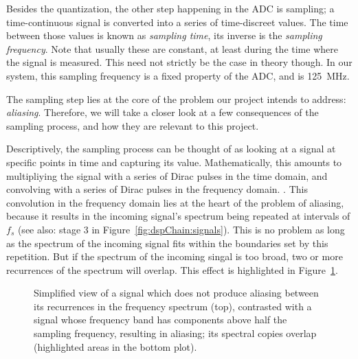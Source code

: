 Besides the quantization,  the other step happening in the  ADC is sampling; a
time-continuous signal is converted into a series of time-discreet values. The
time between those values is known as \emph{sampling time}, its inverse is the
\emph{sampling  frequency}. Note that  usually  these are  constant, at  least
during the  time where the signal  is measured. This need not  strictly be the
case  in theory  though. In our  system, this  sampling frequency  is a  fixed
property of the ADC, and is \SI{125}{\mega\hertz}.

The sampling  step lies  at the  core of  the problem  our project  intends to
address:  \emph{aliasing}. Therefore, we  will take  a  closer look  at a  few
consequences  of the  sampling  process, and  how they  are  relevant to  this
project.

Descriptively, the sampling  process can be thought of as  looking at a signal
at  specific points  in  time and  capturing  its value. Mathematically,  this
amounts to multipliying the  signal with a series of Dirac  pulses in the time
domain,  and  convolving with  a  series  of  Dirac  pulses in  the  frequency
domain\footnotemark.
.
This  convolution  in   the  frequency  domain  lies  at  the   heart  of  the
problem   of  aliasing,   because  it   results  in   the  incoming   signal's
spectrum  being  repeated  at  intervals  of  $f_s$  (see  also:  stage  3  in
Figure~\ref{fig:dspChain:signals}). This is no problem as long as the spectrum
of the incoming signal fits within  the boundaries set by this repetition. But
if  the  spectrum   of  the  incoming  singal  is  too   broad,  two  or  more
recurrences  of  the spectrum  will  overlap. This  effect is  highlighted  in
Figure~\ref{fig:aliasing:band}.

\begin{figure}
    \centering
    
    \caption[Aliasing Illustrated via Signal Frequency Band]{%
        Simplified view  of a signal  which does not produce  aliasing between
        its recurrences  in the  frequency spectrum  (top), contrasted  with a
        signal whose  frequency band  has components  above half  the sampling
        frequency,  resulting   in  aliasing;  its  spectral   copies  overlap
        (highlighted areas in the bottom plot).%
    }
    \label{fig:aliasing:band}
\end{figure}

